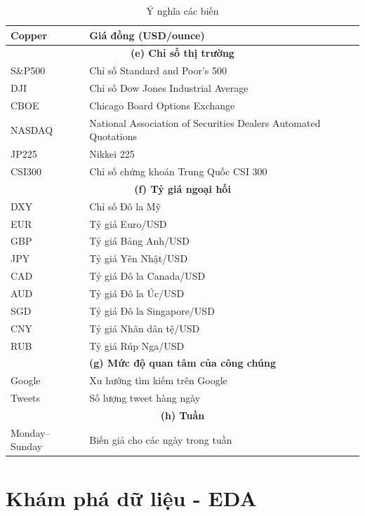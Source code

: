 \begin{table}[h]
{\begin{tabular}{|l|l|}
        Copper & Giá đồng (USD/ounce) \\ \hline
        \multicolumn{2}{|c|}{\textbf{(e) Chỉ số thị trường}} \\ \hline
        S\&P500 & Chỉ số Standard and Poor's 500 \\ \hline
        DJI & Chỉ số Dow Jones Industrial Average \\ \hline
        CBOE & Chicago Board Options Exchange \\ \hline
        NASDAQ & National Association of Securities Dealers Automated Quotations \\ \hline
        JP225 & Nikkei 225 \\ \hline
        CSI300 & Chỉ số chứng khoán Trung Quốc CSI 300 \\ \hline
        \multicolumn{2}{|c|}{\textbf{(f) Tỷ giá ngoại hối}} \\ \hline
        DXY & Chỉ số Đô la Mỹ \\ \hline
        EUR & Tỷ giá Euro/USD \\ \hline
        GBP & Tỷ giá Bảng Anh/USD \\ \hline
        JPY & Tỷ giá Yên Nhật/USD \\ \hline
        CAD & Tỷ giá Đô la Canada/USD \\ \hline
        AUD & Tỷ giá Đô la Úc/USD \\ \hline
        SGD & Tỷ giá Đô la Singapore/USD \\ \hline
        CNY & Tỷ giá Nhân dân tệ/USD \\ \hline
        RUB & Tỷ giá Rúp Nga/USD \\ \hline
        \multicolumn{2}{|c|}{\textbf{(g) Mức độ quan tâm của công chúng}} \\ \hline
        Google & Xu hướng tìm kiếm trên Google \\ \hline
        Tweets & Số lượng tweet hàng ngày \\ \hline
        \multicolumn{2}{|c|}{\textbf{(h) Tuần}} \\ \hline
        Monday--Sunday & Biến giả cho các ngày trong tuần \\ \hline
    \end{tabular}}
    \caption{Ý nghĩa các biến}
    \label{tab:definition_variables}
\end{table}

\clearpage

\section{Khám phá dữ liệu - EDA}

